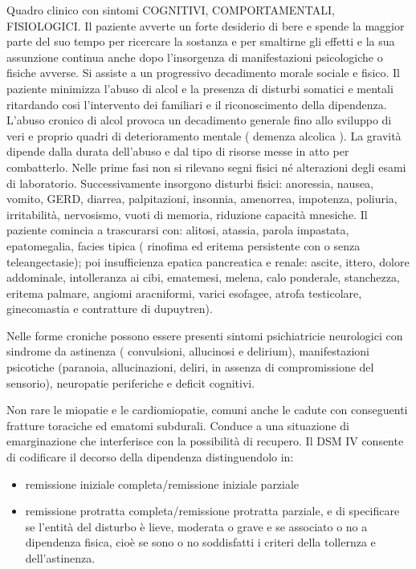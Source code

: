 Quadro clinico con sintomi COGNITIVI, COMPORTAMENTALI, FISIOLOGICI. Il
paziente avverte un forte desiderio di bere e spende la maggior parte
del suo tempo per ricercare la sostanza e per smaltirne gli effetti e la
sua assunzione continua anche dopo l'insorgenza di manifestazioni
psicologiche o fisiche avverse. Si assiste a un progressivo decadimento
morale sociale e fisico. Il paziente minimizza l'abuso di alcol e la
presenza di disturbi somatici e mentali ritardando cosi l'intervento dei
familiari e il riconoscimento della dipendenza. L'abuso cronico di alcol
provoca un decadimento generale fino allo sviluppo di veri e proprio
quadri di deterioramento mentale ( demenza alcolica ). La gravità
dipende dalla durata dell'abuso e dal tipo di risorse messe in atto per
combatterlo. Nelle prime fasi non si rilevano segni fisici né
alterazioni degli esami di laboratorio. Successivamente insorgono
disturbi fisici: anoressia, nausea, vomito, GERD, diarrea, palpitazioni,
insonnia, amenorrea, impotenza, poliuria, irritabilità, nervosismo,
vuoti di memoria, riduzione capacità mnesiche. Il paziente comincia a
trascurarsi con: alitosi, atassia, parola impastata, epatomegalia,
facies tipica ( rinofima ed eritema persistente con o senza
teleangectasie); poi insufficienza epatica pancreatica e renale: ascite,
ittero, dolore addominale, intolleranza ai cibi, ematemesi, melena, calo
ponderale, stanchezza, eritema palmare, angiomi aracniformi, varici
esofagee, atrofa testicolare, ginecomastia e contratture di dupuytren).

Nelle forme croniche possono essere presenti sintomi psichiatricie
neurologici con sindrome da astinenza ( convulsioni, allucinosi e
delirium), manifestazioni psicotiche (paranoia, allucinazioni, deliri,
in assenza di compromissione del sensorio), neuropatie periferiche e
deficit cognitivi.

Non rare le miopatie e le cardiomiopatie, comuni anche le cadute con
conseguenti fratture toraciche ed ematomi subdurali. Conduce a una
situazione di emarginazione che interferisce con la possibilità di
recupero. Il DSM IV consente di codificare il decorso della dipendenza
distinguendolo in:
\begin{itemize}
\item remissione iniziale completa/remissione iniziale parziale
\item remissione protratta completa/remissione protratta parziale, e di
specificare se l'entità del disturbo è lieve, moderata o grave e se
associato o no a dipendenza fisica, cioè se sono o no soddisfatti i
criteri della tollernza e dell'astinenza.
\end{itemize}

